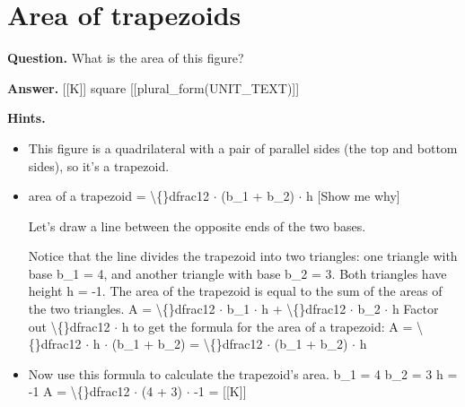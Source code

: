 \documentclass{article}
\begin{document}
\section*{Area of trapezoids}
\textbf{Question.} What is the area of this figure?

\textbf{Answer.} [[K]]
                    square [[plural\_form(UNIT\_TEXT)]]

\textbf{Hints.}
\begin{itemize}
  \item This figure is a quadrilateral with a pair of parallel sides (the top and bottom sides), so it's a trapezoid.
  \item area of a trapezoid = \textbackslash\{\}dfrac12 $\cdot$ (b\_1 + b\_2) $\cdot$ h
                            [Show me why]
                        
                        
                            Let's draw a line between the opposite ends of the two bases.
                            
                            Notice that the line divides the trapezoid into two triangles: one triangle with base b\_1 = 4, and another triangle with base b\_2 = 3. Both triangles have height h = -1.
                            The area of the trapezoid is equal to the sum of the areas of the two triangles.
                            A = \textbackslash\{\}dfrac12 $\cdot$ b\_1 $\cdot$ h + \textbackslash\{\}dfrac12 $\cdot$ b\_2 $\cdot$ h
                            Factor out \textbackslash\{\}dfrac12 $\cdot$ h to get the formula for the area of a trapezoid:
                            A = \textbackslash\{\}dfrac12 $\cdot$ h $\cdot$ (b\_1 + b\_2) = \textbackslash\{\}dfrac12 $\cdot$ (b\_1 + b\_2) $\cdot$ h
  \item Now use this formula to calculate the trapezoid's area.
                        b\_1 = 4
                        b\_2 = 3
                        h = -1
                        A = \textbackslash\{\}dfrac12 $\cdot$ (4 + 3) $\cdot$ -1 = [[K]]
\end{itemize}
\end{document}
